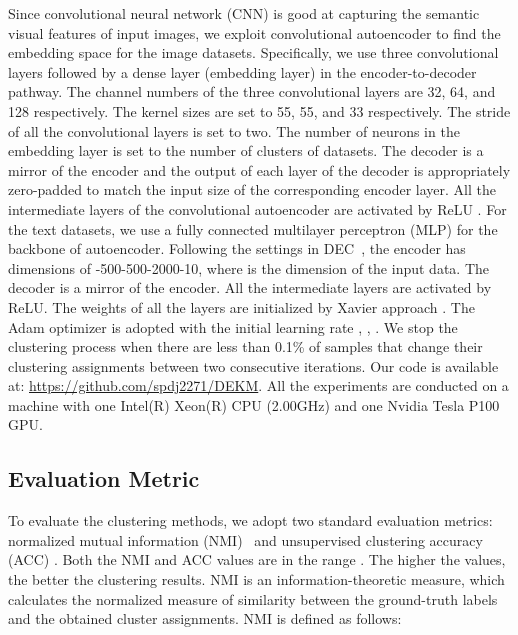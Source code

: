 Since convolutional neural network (CNN) is good at capturing the semantic visual features of input images, we exploit convolutional autoencoder to find the embedding space for the image datasets. Specifically, we use three convolutional layers followed by a dense layer (embedding layer) in the encoder-to-decoder pathway. The channel numbers of the three convolutional layers are 32, 64, and 128 respectively. The kernel sizes are set to 55, 55, and 33 respectively. The stride of all the convolutional layers is set to two. The number of neurons in the embedding layer is set to the number of clusters of datasets. The decoder is a mirror of the encoder and the output of each layer of the decoder is appropriately zero-padded to match the input size of the corresponding encoder layer. All the intermediate layers of the convolutional autoencoder are activated by ReLU \cite{krizhevsky2012imagenet}. For the text datasets, we use a fully connected multilayer perceptron (MLP) for the backbone of autoencoder. Following the settings in DEC~\cite{DEC_xie2016unsupervised}, the encoder has dimensions of -500-500-2000-10, where  is the dimension of the input data. The decoder is a mirror of the encoder. All the intermediate layers are activated by ReLU. The weights of all the layers are initialized by Xavier approach \cite{glorot2010understanding}. The Adam \cite{kingma2014adam} optimizer is adopted with the initial learning rate  , , . 
We stop the clustering process when there are less than 0.1\% of samples that change their clustering assignments between two consecutive iterations. Our code is available at: \textcolor{blue}{\url{https://github.com/spdj2271/DEKM}}. All the experiments are conducted on a machine with one Intel(R) Xeon(R) CPU (2.00GHz) and one Nvidia Tesla P100 GPU.



\subsection{Evaluation Metric}

To evaluate the clustering methods, we adopt two standard evaluation metrics: normalized mutual information (NMI)~\cite{vinh2010information} and unsupervised clustering accuracy (ACC) \cite{xu2003document}. Both the NMI and ACC values are in the range . The higher the values, the better the clustering results. NMI is an information-theoretic measure, which calculates the normalized measure of similarity between the ground-truth labels and the obtained cluster assignments. NMI is defined as follows:



